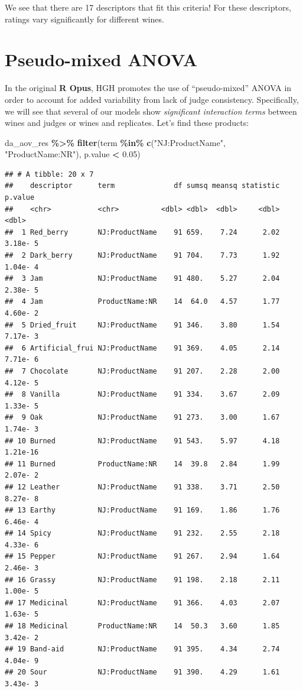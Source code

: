 \documentclass[
]{book}
\newenvironment{Shaded}{\begin{snugshade}}{\end{snugshade}}
\newcommand{\FloatTok}[1]{\textcolor[rgb]{0.00,0.00,0.81}{#1}}
\newcommand{\FunctionTok}[1]{\textcolor[rgb]{0.13,0.29,0.53}{\textbf{#1}}}
\newcommand{\NormalTok}[1]{#1}
\newcommand{\SpecialCharTok}[1]{\textcolor[rgb]{0.81,0.36,0.00}{\textbf{#1}}}
\newcommand{\StringTok}[1]{\textcolor[rgb]{0.31,0.60,0.02}{#1}}
\begin{document}
We see that there are 17 descriptors that fit this criteria! For these descriptors, ratings vary significantly for different wines.

\section{Pseudo-mixed ANOVA}\label{pseudo-mixed-anova}

In the original \textbf{R Opus}, HGH promotes the use of ``pseudo-mixed'' ANOVA in order to account for added variability from lack of judge consistency. Specifically, we will see that several of our models show \emph{significant interaction terms} between wines and judges or wines and replicates. Let's find these products:

\begin{Shaded}
\begin{Highlighting}[]
\NormalTok{da\_aov\_res }\SpecialCharTok{\%\textgreater{}\%}
  \FunctionTok{filter}\NormalTok{(term }\SpecialCharTok{\%in\%} \FunctionTok{c}\NormalTok{(}\StringTok{"NJ:ProductName"}\NormalTok{, }\StringTok{"ProductName:NR"}\NormalTok{),}
\NormalTok{         p.value }\SpecialCharTok{\textless{}} \FloatTok{0.05}\NormalTok{)}
\end{Highlighting}
\end{Shaded}

\begin{verbatim}
## # A tibble: 20 x 7
##    descriptor      term              df sumsq meansq statistic  p.value
##    <chr>           <chr>          <dbl> <dbl>  <dbl>     <dbl>    <dbl>
##  1 Red_berry       NJ:ProductName    91 659.    7.24      2.02 3.18e- 5
##  2 Dark_berry      NJ:ProductName    91 704.    7.73      1.92 1.04e- 4
##  3 Jam             NJ:ProductName    91 480.    5.27      2.04 2.38e- 5
##  4 Jam             ProductName:NR    14  64.0   4.57      1.77 4.60e- 2
##  5 Dried_fruit     NJ:ProductName    91 346.    3.80      1.54 7.17e- 3
##  6 Artificial_frui NJ:ProductName    91 369.    4.05      2.14 7.71e- 6
##  7 Chocolate       NJ:ProductName    91 207.    2.28      2.00 4.12e- 5
##  8 Vanilla         NJ:ProductName    91 334.    3.67      2.09 1.33e- 5
##  9 Oak             NJ:ProductName    91 273.    3.00      1.67 1.74e- 3
## 10 Burned          NJ:ProductName    91 543.    5.97      4.18 1.21e-16
## 11 Burned          ProductName:NR    14  39.8   2.84      1.99 2.07e- 2
## 12 Leather         NJ:ProductName    91 338.    3.71      2.50 8.27e- 8
## 13 Earthy          NJ:ProductName    91 169.    1.86      1.76 6.46e- 4
## 14 Spicy           NJ:ProductName    91 232.    2.55      2.18 4.33e- 6
## 15 Pepper          NJ:ProductName    91 267.    2.94      1.64 2.46e- 3
## 16 Grassy          NJ:ProductName    91 198.    2.18      2.11 1.00e- 5
## 17 Medicinal       NJ:ProductName    91 366.    4.03      2.07 1.63e- 5
## 18 Medicinal       ProductName:NR    14  50.3   3.60      1.85 3.42e- 2
## 19 Band-aid        NJ:ProductName    91 395.    4.34      2.74 4.04e- 9
## 20 Sour            NJ:ProductName    91 390.    4.29      1.61 3.43e- 3
\end{verbatim}
\end{document}
